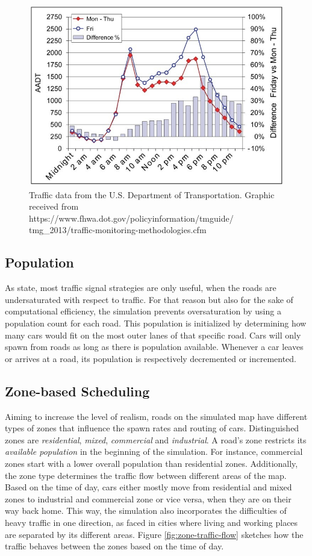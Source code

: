 \documentclass[11pt]{article}
\begin{document}
\begin{figure}[t]
	\includegraphics[width=\linewidth]{img/traffic-data.jpeg}
	\caption{Traffic data from the U.S. Department of Transportation. Graphic received from https://www.fhwa.dot.gov/policyinformation/tmguide/
	tmg\_2013/traffic-monitoring-methodologies.cfm \label{fig:traffic-data}}
\end{figure} 

\subsection{Population}
As \citet{papageorgiou2003review} state, most traffic signal strategies are only useful, when the roads are undersaturated with respect to traffic. For that reason but also for the sake of computational efficiency, the simulation prevents oversaturation by using a population count for each road. This population is initialized by determining how many cars would fit on the most outer lanes of that specific road. Cars will only spawn from roads as long as there is population available. Whenever a car leaves or arrives at a road, its population is respectively decremented or incremented.

\subsection{Zone-based Scheduling}
Aiming to increase the level of realism, roads on the simulated map have different types of zones that influence the spawn rates and routing of cars. Distinguished zones are \textit{residential}, \textit{mixed}, \textit{commercial} and \textit{industrial}. A road's zone restricts its \textit{available population} in the beginning of the simulation. For instance, commercial zones start with a lower overall population than residential zones. Additionally, the zone type determines the traffic flow between different areas of the map. Based on the time of day, cars either mostly move from residential and mixed zones to industrial and commercial zone or vice versa, when they are on their way back home. This way, the simulation also incorporates the difficulties of heavy traffic in one direction, as faced in cities where living and working places are separated by its different areas. Figure \ref{fig:zone-traffic-flow} sketches how the traffic behaves between the zones based on the time of day.
\end{document}
